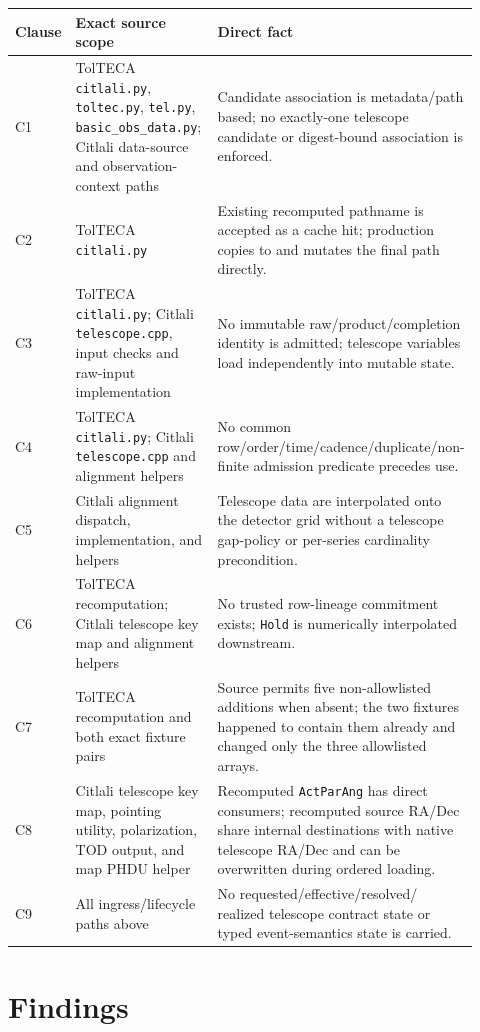 \documentclass[11pt]{article}
\newcommand{\code}[1]{\texttt{#1}}
\begin{document}
\begin{longtable}{@{}L{0.10\linewidth}L{0.42\linewidth}L{0.40\linewidth}@{}}
\toprule
Clause & Exact source scope & Direct fact \\
\midrule
\endhead
C1 & TolTECA \code{citlali.py}, \code{toltec.py}, \code{tel.py},
\code{basic\_obs\_data.py}; Citlali data-source and observation-context paths
& Candidate association is metadata/path based; no exactly-one telescope
candidate or digest-bound association is enforced. \\
C2 & TolTECA \code{citlali.py} & Existing recomputed pathname is accepted as a
cache hit; production copies to and mutates the final path directly. \\
C3 & TolTECA \code{citlali.py}; Citlali \code{telescope.cpp}, input checks and
raw-input implementation & No immutable raw/product/completion identity is
admitted; telescope variables load independently into mutable state. \\
C4 & TolTECA \code{citlali.py}; Citlali \code{telescope.cpp} and alignment
helpers & No common row/order/time/cadence/duplicate/non-finite admission
predicate precedes use. \\
C5 & Citlali alignment dispatch, implementation, and helpers & Telescope data
are interpolated onto the detector grid without a telescope gap-policy or
per-series cardinality precondition. \\
C6 & TolTECA recomputation; Citlali telescope key map and alignment helpers &
No trusted row-lineage commitment exists; \code{Hold} is numerically
interpolated downstream. \\
C7 & TolTECA recomputation and both exact fixture pairs & Source permits five
non-allowlisted additions when absent; the two fixtures happened to contain
them already and changed only the three allowlisted arrays. \\
C8 & Citlali telescope key map, pointing utility, polarization, TOD output, and
map PHDU helper & Recomputed \code{ActParAng} has direct consumers;
recomputed source RA/Dec share internal destinations with native telescope
RA/Dec and can be overwritten during ordered loading. \\
C9 & All ingress/lifecycle paths above & No requested/effective/resolved/
realized telescope contract state or typed event-semantics state is carried. \\
\bottomrule
\end{longtable}

\section{Findings}
\end{document}
